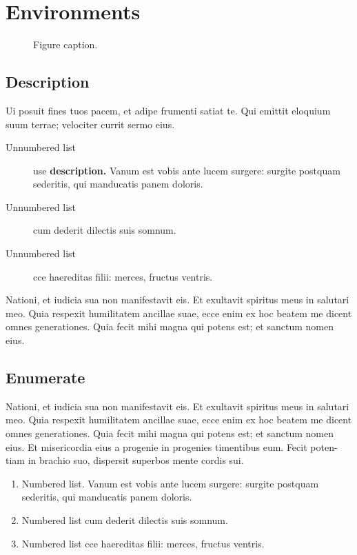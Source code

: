\documentclass{ao2e}%
\begin{document}
\section{Environments}

\begin{figure}[t]
\leavevmode{}
\caption{Figure caption.}
\end{figure}

\subsection{Description}
Ui posuit fines tuos pacem,
et adipe frumenti satiat te. Qui emittit eloquium suum terrae;
velociter currit sermo eius.

\begin{description}
\item[Unnumbered list] use \textbf{description.} Vanum est vobis ante lucem surgere: surgite
postquam sederitis, qui manducatis panem doloris.

\item[Unnumbered list] cum dederit dilectis suis somnum.

\item[Unnumbered list] cce haereditas filii: merces, fructus ventris.
\end{description}

Nationi, et iudicia sua non manifestavit eis. Et exultavit spiritus meus
in salutari meo.  Quia respexit humilitatem ancillae suae, ecce enim ex
hoc beatem me dicent omnes generationes. Quia fecit mihi magna qui potens
est; et sanctum nomen eius.

\subsection{Enumerate}

Nationi, et iudicia sua non manifestavit eis. Et exultavit spiritus meus
in salutari meo.  Quia respexit humilitatem ancillae suae, ecce enim ex
hoc beatem me dicent omnes generationes. Quia fecit mihi magna qui potens
est; et sanctum nomen eius. Et misericordia eius a progenie in progenies
timentibus eum. Fecit poten-tiam in brachio suo, dispersit superbos mente
cordis sui.

\begin{enumerate}
\item Numbered list. Vanum est vobis ante lucem surgere: surgite
postquam sederitis, qui manducatis panem doloris.

\item Numbered list cum dederit dilectis suis somnum.

\item Numbered list cce haereditas filii: merces, fructus ventris.
\end{enumerate}
\end{document}
